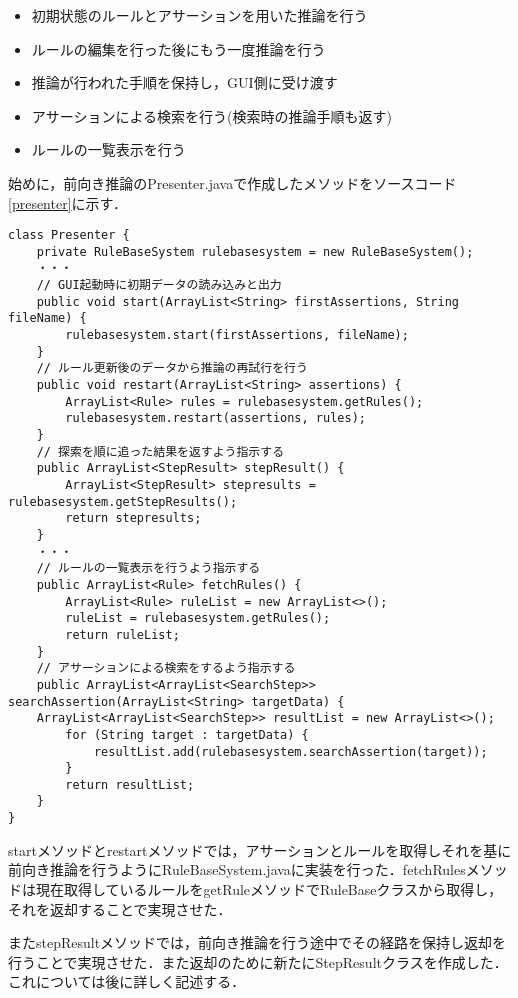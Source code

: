 \documentclass[12pt]{jarticle}
\begin{document}
\begin{itemize}
	\item 初期状態のルールとアサーションを用いた推論を行う
	\item ルールの編集を行った後にもう一度推論を行う
	\item 推論が行われた手順を保持し，GUI側に受け渡す
	\item アサーションによる検索を行う(検索時の推論手順も返す)
	\item ルールの一覧表示を行う
\end{itemize}

始めに，前向き推論のPresenter.javaで作成したメソッドをソースコード\ref{presenter}に示す．
\begin{lstlisting}[caption=Presenter.java(略),label=presenter]
class Presenter {
	private RuleBaseSystem rulebasesystem = new RuleBaseSystem();
	・・・
	// GUI起動時に初期データの読み込みと出力
	public void start(ArrayList<String> firstAssertions, String fileName) {
		rulebasesystem.start(firstAssertions, fileName);
	}
	// ルール更新後のデータから推論の再試行を行う
	public void restart(ArrayList<String> assertions) {
		ArrayList<Rule> rules = rulebasesystem.getRules();
		rulebasesystem.restart(assertions, rules);
	}
	// 探索を順に追った結果を返すよう指示する
	public ArrayList<StepResult> stepResult() {
		ArrayList<StepResult> stepresults = rulebasesystem.getStepResults();
		return stepresults;
	}
	・・・
	// ルールの一覧表示を行うよう指示する
	public ArrayList<Rule> fetchRules() {
		ArrayList<Rule> ruleList = new ArrayList<>();
		ruleList = rulebasesystem.getRules();
		return ruleList;
	}
	// アサーションによる検索をするよう指示する
	public ArrayList<ArrayList<SearchStep>> searchAssertion(ArrayList<String> targetData) {
	ArrayList<ArrayList<SearchStep>> resultList = new ArrayList<>();
		for (String target : targetData) {
			resultList.add(rulebasesystem.searchAssertion(target));
		}
		return resultList;
	}
}
\end{lstlisting}
startメソッドとrestartメソッドでは，アサーションとルールを取得しそれを基に前向き推論を行うようにRuleBaseSystem.javaに実装を行った．fetchRulesメソッドは現在取得しているルールをgetRuleメソッドでRuleBaseクラスから取得し，それを返却することで実現させた．\par
またstepResultメソッドでは，前向き推論を行う途中でその経路を保持し返却を行うことで実現させた．また返却のために新たにStepResultクラスを作成した．これについては後に詳しく記述する．\\
\end{document}
